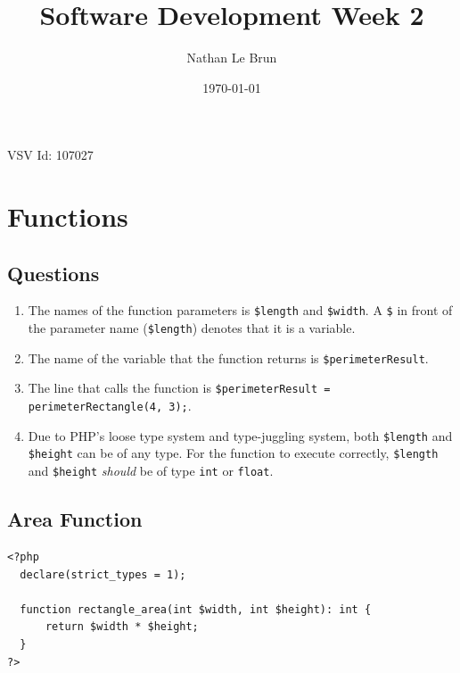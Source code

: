 \documentclass{article}
\title{Software Development Week 2}
\author{Nathan Le Brun}
\date{\today}
\begin{document}
    \maketitle
    \begin{flushleft}
        VSV Id: 107027
    \end{flushleft}
    \section{Functions}
        \subsection[1a]{Questions}
            \begin{enumerate}
                \item The names of the function parameters is \verb|$length| and \verb|$width|. A \verb|$| in front of the parameter name (\verb|$length|) denotes that it is a variable.
                \item The name of the variable that the function returns is \verb|$perimeterResult|.
                \item The line that calls the function is \verb|$perimeterResult = perimeterRectangle(4, 3);|.
                \item Due to PHP's loose type system and type-juggling system, both \verb|$length| and \verb|$height| can be of any type. For the function to execute correctly, \verb|$length| and \verb|$height| \textit{should} be of type \verb|int| or \verb|float|.
            \end{enumerate}
        \subsection{Area Function}
            \begin{verbatim}
<?php
  declare(strict_types = 1);
  
  function rectangle_area(int $width, int $height): int {
      return $width * $height;
  }
?>
            \end{verbatim}
    
    
\end{document}
